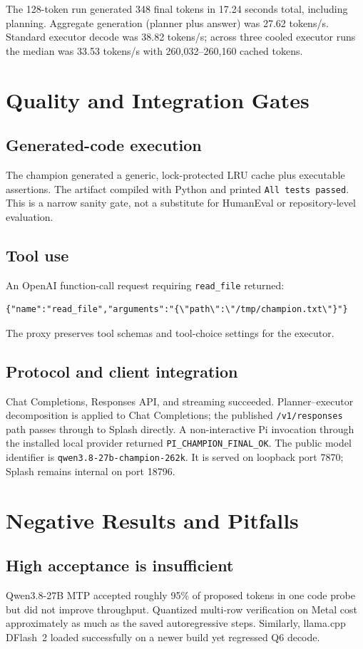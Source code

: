 \documentclass[11pt]{article}
\begin{document}
The 128-token run generated 348 final tokens in 17.24 seconds total, including planning. Aggregate generation (planner plus answer) was 27.62 tokens/s. Standard executor decode was 38.82 tokens/s; across three cooled executor runs the median was 33.53 tokens/s with 260{,}032--260{,}160 cached tokens.

\section{Quality and Integration Gates}
\subsection{Generated-code execution}
The champion generated a generic, lock-protected LRU cache plus executable assertions. The artifact compiled with Python and printed \texttt{All tests passed}. This is a narrow sanity gate, not a substitute for HumanEval or repository-level evaluation.

\subsection{Tool use}
An OpenAI function-call request requiring \texttt{read\_file} returned:
\begin{verbatim}
{"name":"read_file","arguments":"{\"path\":\"/tmp/champion.txt\"}"}
\end{verbatim}
The proxy preserves tool schemas and tool-choice settings for the executor.

\subsection{Protocol and client integration}
Chat Completions, Responses API, and streaming succeeded. Planner--executor decomposition is applied to Chat Completions; the published \texttt{/v1/responses} path passes through to Splash directly. A non-interactive Pi invocation through the installed local provider returned \texttt{PI\_CHAMPION\_FINAL\_OK}. The public model identifier is \nolinkurl{qwen3.8-27b-champion-262k}. It is served on loopback port 7870; Splash remains internal on port 18796.

\section{Negative Results and Pitfalls}
\subsection{High acceptance is insufficient}
Qwen3.8-27B MTP accepted roughly 95\% of proposed tokens in one code probe but did not improve throughput. Quantized multi-row verification on Metal cost approximately as much as the saved autoregressive steps. Similarly, llama.cpp DFlash~2 loaded successfully on a newer build yet regressed Q6 decode.
\end{document}
